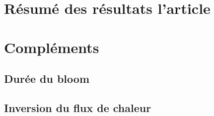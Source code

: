 
\label{chp:res-phenologie}

\minitoc%
\clearpage

\section{Résumé des résultats l'article}
\label{sec:resume-res-phenologie}

\section{Compléments}
\label{sec:complements-phenologie}

\subsection{Durée du bloom}
\label{sec:duree-du-bloom}

\subsection{Inversion du flux de chaleur}
\label{sec:flux-chaleur}
